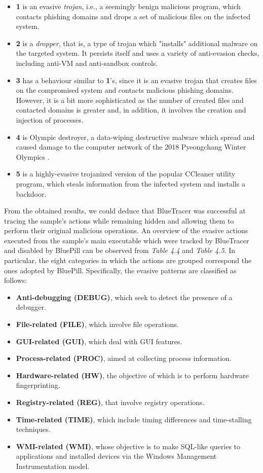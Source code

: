 \begin{itemize}
\item \textbf{1} is an evasive \textit{trojan}, i.e., a seemingly benign malicious program, which contacts phishing domains and drops a set of malicious files on the infected system.
\item \textbf{2} is a \textit{dropper}, that is, a type of trojan which "installs" additional malware on the targeted system. It persists itself and uses a variety of anti-evasion checks, including anti-VM and anti-sandbox controls. 
\item \textbf{3} has a behaviour similar to \textbf{1}'s, since it is an evasive trojan that creates files on the compromised system and contacts malicious phishing domains. However, it is a bit more sophisticated as the number of created files and contacted domains is greater and, in addition, it involves the creation and injection of processes.
\item \textbf{4} is Olympic destroyer, a data-wiping destructive malware which spread and caused damage to the computer network of the 2018 Pyeongchang Winter Olympics \cite{OlympicDestroyer}.  
\item \textbf{5} is a highly-evasive trojanized version of the popular CCleaner utility program, which steals information from the infected system and installs a backdoor.
\end{itemize}

From the obtained results, we could deduce that BlueTracer was successful at tracing the sample's actions while remaining hidden and allowing them to perform their original malicious operations. An overview of the evasive actions executed from the sample's main executable which were tracked by BlueTracer and disabled by BluePill can be observed from \textit{Table 4.4} and \textit{Table 4.5}. In particular, the eight categories in which the actions are grouped correspond the ones adopted by BluePill. Specifically, the evasive patterns are classified as follows:

\begin{itemize}
\item \textbf{Anti-debugging (DEBUG)}, which seek to detect the presence of a debugger.
\item \textbf{File-related (FILE)}, which involve file operations.
\item \textbf{GUI-related (GUI)}, which deal with GUI features.
\item \textbf{Process-related (PROC)}, aimed at collecting process information.
\item \textbf{Hardware-related (HW)}, the objective of which is to perform hardware fingerprinting.
\item \textbf{Registry-related (REG)}, that involve registry operations.
\item \textbf{Time-related (TIME)}, which include timing differences and time-stalling techniques.
\item \textbf{WMI-related (WMI)}, whose objective is to make SQL-like queries to applications and installed devices via the Windows Management Instrumentation model.
\end{itemize}  

